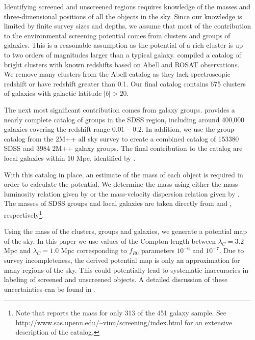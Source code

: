 \documentclass{emulateapj}
\begin{document}
Identifying screened and unscreened regions requires knowledge of the masses and
three-dimensional positions of all the objects in the sky.
Since our knowledge is limited by finite survey sizes and depths,
we assume that most of the contribution to the environmental screening
potential comes from
clusters and groups of galaxies. This is a reasonable assumption as the
potential of a rich cluster is up to 
two orders of magnitudes larger than a typical galaxy. \citet{cabre2012}
compiled a catalog of bright clusters with known redshifts based on 
Abell \citep{abe89} and ROSAT \citep{ebe96} observations. We remove many
clusters from the Abell catalog as they lack spectroscopic
redshift or have redshift greater than 0.1. Our final catalog contains 675
clusters of galaxies with galactic latitude $\left|b\right| > 20$.

The next most significant contribution comes from galaxy groups.
\citet{yan07} provides a nearly complete catalog of groups in the SDSS region,
including around 400,000 galaxies
covering the redshift range $0.01-0.2$.
In addition, we use the group catalog from the 2M++ all
sky survey \citep{lav011} to create a combined catalog of
153380 SDSS and 3984 2M++ galaxy groups.
The final contribution to the catalog are
local galaxies within 10 Mpc, identified by \citet{kar04}. 

With this catalog in place, an estimate of the mass of each object
is required in order to calculate the potential.
We determine the mass using either the mass-luminosity relation given by
\citet{rei02} or the mass-velocity dispersion relation given by \citet{evr08}.
The masses of SDSS groups and local galaxies are taken directly from
\citet{yan07} and \citet{kar04}, respectively\footnote{Note
that \citet{kar04} reports the mass for only 313 of the 451 galaxy sample.
See \url{http://www.sas.upenn.edu/~vinu/screening/index.html}
for an extensive
description of the catalog.}.

Using the mass of the clusters, groups and galaxies, we generate a
potential map of the sky.
In this paper we use values of the Compton length between $\lambda_C
= 3.2$ Mpc and  $\lambda_C = 1.0$ Mpc corresponding to $f_{R0}$ parameters
$10^{-6}$ and $10^{-7}$.  
Due to survey incompleteness, the derived potential map
is only an approximation for many regions of the sky. This could potentially
lead to systematic inaccuracies in labeling of screened and unscreened objects.
A detailed discussion of these uncertainties can be found in \citet{cabre2012}. 
 
\end{document}
